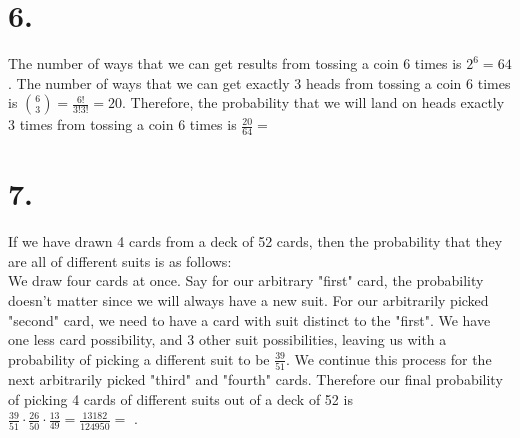 \documentclass{article}
\begin{document}
\section*{6.}
{\Large 

The number of ways that we can get results from tossing a coin 6 times is $2^6 = 64$. The number of ways that we can get exactly 3 heads from tossing a coin 6 times is $\binom{6}{3} = \frac{6!}{3!3!} = 20$. Therefore, the probability that we will land on heads exactly 3 times from tossing a coin 6 times is $\frac{20}{64} = $ 

}

\section*{7.}
{\Large 

If we have drawn 4 cards from a deck of 52 cards, then the probability that they are all of different suits is as follows: \\
We draw four cards at once. Say for our arbitrary "first" card, the probability doesn't matter since we will always have a new suit. For our arbitrarily picked "second" card, we need to have a card with suit distinct to the "first". We have one less card possibility, and 3 other suit possibilities, leaving us with a probability of picking a different suit to be $\frac{39}{51}$. We continue this process for the next arbitrarily picked "third" and "fourth" cards. Therefore our final probability of picking 4 cards of different suits out of a deck of 52 is \\ 
$\frac{39}{51} \cdot \frac{26}{50} \cdot \frac{13}{49} = \frac{13182}{124950} = $ . 

}
\end{document}

